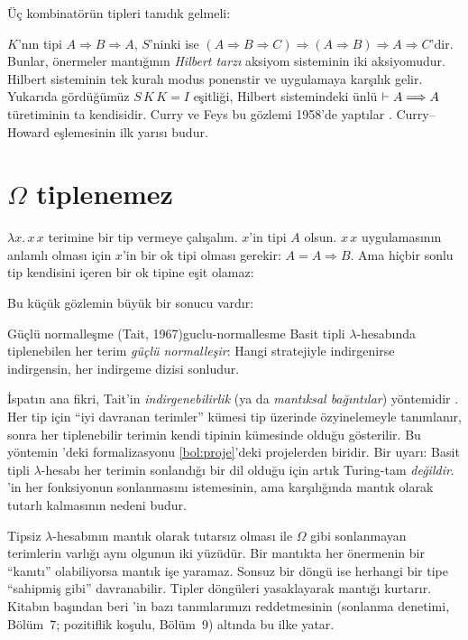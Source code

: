 Üç kombinatörün tipleri tanıdık gelmeli:


\noindent $K$'nın tipi $A \Rightarrow B \Rightarrow A$, $S$'ninki ise
$(A \Rightarrow B \Rightarrow C) \Rightarrow (A \Rightarrow B)
\Rightarrow A \Rightarrow C$'dir. Bunlar, önermeler mantığının
\emph{Hilbert tarzı} aksiyom sisteminin iki aksiyomudur. Hilbert
sisteminin tek kuralı modus ponenstir ve uygulamaya karşılık gelir.
Yukarıda gördüğümüz $S\,K\,K = I$ eşitliği, Hilbert sistemindeki ünlü
$\vdash A \Longrightarrow A$ türetiminin ta kendisidir. Curry ve Feys bu gözlemi
1958'de yaptılar \citep{curry1958}. Curry--Howard eşlemesinin ilk yarısı
budur.

\section{$Ω$ tiplenemez}\label{sec:omega-tip}

$\lambda x.\, x\,x$ terimine bir tip vermeye çalışalım. $x$'in tipi $A$
olsun. $x\,x$ uygulamasının anlamlı olması için $x$'in bir ok tipi
olması gerekir: $A = A \Rightarrow B$. Ama hiçbir sonlu tip kendisini
içeren bir ok tipine eşit olamaz:


\noindent Bu küçük gözlemin büyük bir sonucu vardır:

\begin{teorem}{Güçlü normalleşme (Tait, 1967)}{guclu-normallesme}
Basit tipli $\lambda$-hesabında tiplenebilen her terim \emph{güçlü
normalleşir}: Hangi stratejiyle indirgenirse indirgensin, her indirgeme
dizisi sonludur.
\end{teorem}

\noindent İspatın ana fikri, Tait'in \emph{indirgenebilirlik} (ya da
\emph{mantıksal bağıntılar}) yöntemidir \citep{tait1967}. Her tip için
``iyi davranan terimler'' kümesi tip üzerinde özyinelemeyle tanımlanır,
sonra her tiplenebilir terimin kendi tipinin kümesinde olduğu gösterilir.
Bu yöntemin \Lean{}'deki formalizasyonu \cref{bol:proje}'deki projelerden
biridir. Bir uyarı: Basit tipli $\lambda$-hesabı her terimin sonlandığı
bir dil olduğu için artık Turing-tam \emph{değildir}. \Lean{}'in her
fonksiyonun sonlanmasını istemesinin, ama karşılığında mantık olarak
tutarlı kalmasının nedeni budur.

\begin{onemlifikir}
Tipsiz $\lambda$-hesabının mantık olarak tutarsız olması ile $\Omega$ gibi
sonlanmayan terimlerin varlığı aynı olgunun iki yüzüdür. Bir mantıkta her
önermenin bir ``kanıtı'' olabiliyorsa mantık işe yaramaz. Sonsuz bir döngü
ise herhangi bir tipe ``sahipmiş gibi'' davranabilir. Tipler döngüleri
yasaklayarak mantığı kurtarır. Kitabın başından beri \Lean{}'in bazı
tanımlarımızı reddetmesinin (sonlanma denetimi, Bölüm~7; pozitiflik
koşulu, Bölüm~9) altında bu ilke yatar.
\end{onemlifikir}

